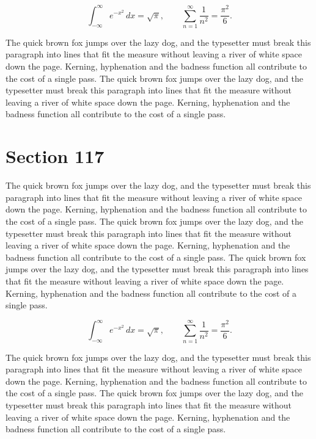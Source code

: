 \documentclass{article}
\begin{document}
\begin{equation}
\int_{-\infty}^{\infty} e^{-x^{2}}\,dx = \sqrt{\pi}, \qquad
\sum_{n=1}^{\infty} \frac{1}{n^{2}} = \frac{\pi^{2}}{6}.
\end{equation}

The quick brown fox jumps over the lazy dog, and the typesetter must break this paragraph into lines that fit the measure without leaving a river of white space down the page. Kerning, hyphenation and the badness function all contribute to the cost of a single pass. The quick brown fox jumps over the lazy dog, and the typesetter must break this paragraph into lines that fit the measure without leaving a river of white space down the page. Kerning, hyphenation and the badness function all contribute to the cost of a single pass. 
\section{Section 117}
The quick brown fox jumps over the lazy dog, and the typesetter must break this paragraph into lines that fit the measure without leaving a river of white space down the page. Kerning, hyphenation and the badness function all contribute to the cost of a single pass. The quick brown fox jumps over the lazy dog, and the typesetter must break this paragraph into lines that fit the measure without leaving a river of white space down the page. Kerning, hyphenation and the badness function all contribute to the cost of a single pass. The quick brown fox jumps over the lazy dog, and the typesetter must break this paragraph into lines that fit the measure without leaving a river of white space down the page. Kerning, hyphenation and the badness function all contribute to the cost of a single pass. 

\begin{equation}
\int_{-\infty}^{\infty} e^{-x^{2}}\,dx = \sqrt{\pi}, \qquad
\sum_{n=1}^{\infty} \frac{1}{n^{2}} = \frac{\pi^{2}}{6}.
\end{equation}

The quick brown fox jumps over the lazy dog, and the typesetter must break this paragraph into lines that fit the measure without leaving a river of white space down the page. Kerning, hyphenation and the badness function all contribute to the cost of a single pass. The quick brown fox jumps over the lazy dog, and the typesetter must break this paragraph into lines that fit the measure without leaving a river of white space down the page. Kerning, hyphenation and the badness function all contribute to the cost of a single pass. 
\end{document}
